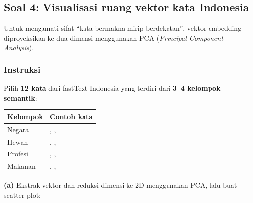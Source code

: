 \documentclass[12pt, a4paper]{article}
\begin{document}
\clearpage
\subsection{Soal 4: Visualisasi ruang vektor kata Indonesia}
\label{sec:soal4}

Untuk mengamati sifat ``kata bermakna mirip berdekatan'', vektor embedding diproyeksikan ke dua dimensi menggunakan PCA (\emph{Principal Component Analysis}).

\subsubsection{Instruksi}
\label{sec:soal4-instruksi}

Pilih \textbf{12 kata} dari fastText Indonesia yang terdiri dari \textbf{3--4 kelompok semantik}:

\begin{center}\small
\begin{tabular}{@{} L{2.5cm} L{8cm} @{}}
  \toprule \textbf{Kelompok} & \textbf{Contoh kata} \\
  \midrule
  Negara  & , ,  \\
  Hewan   & , ,  \\
  Profesi & , ,  \\
  Makanan & , ,  \\
  \bottomrule
\end{tabular}
\end{center}

\textbf{(a)} Ekstrak vektor dan reduksi dimensi ke 2D menggunakan PCA, lalu buat scatter plot:
\end{document}
